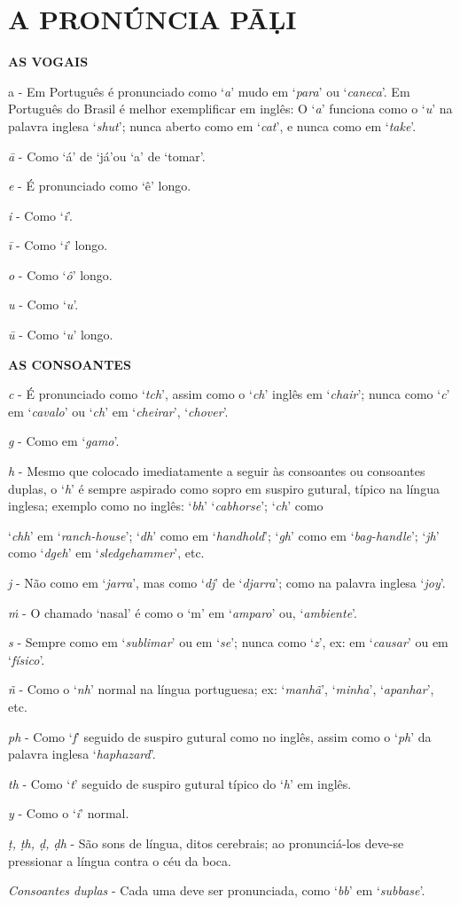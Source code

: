 \chapter{A PRONÚNCIA PĀḶI}

\textbf{AS VOGAIS}


a - Em Português é pronunciado como `\emph{a}' mudo em `\emph{para}' ou `\emph{caneca}'. Em Português do Brasil é melhor exemplificar em inglês: O `\emph{a}' funciona como o `\emph{u}' na palavra inglesa `\emph{shut}'; nunca aberto como em `\emph{cat}', e nunca como em `\emph{take}'.

\emph{ā} - Como `á' de `já'ou `a' de `tomar'.

\emph{e} - É pronunciado como `ê' longo.

\emph{i} - Como `\emph{i}'.

\emph{ī} - Como `\emph{i}' longo.

\emph{o} - Como `\emph{ô}' longo.

\emph{u} - Como `\emph{u}'.

\emph{ū} - Como `\emph{u}' longo.

\textbf{AS CONSOANTES}

\emph{c} - É pronunciado como `\emph{tch}', assim como o `\emph{ch}' inglês em `\emph{chair}'; nunca como `\emph{c}' em `\emph{cavalo}' ou `\emph{ch}' em `\emph{cheirar}', `\emph{chover}'.

\emph{g} - Como em `\emph{gamo}'.

\emph{h} - Mesmo que colocado imediatamente a seguir às consoantes ou consoantes duplas, o `\emph{h}' é sempre aspirado como sopro em suspiro gutural, típico na língua inglesa; exemplo como no inglês: `\emph{bh}' `\emph{cabhorse}'; `\emph{ch}' como

`\emph{chh}' em `\emph{ranch-house}'; `\emph{dh}' como em `\emph{handhold}'; `\emph{gh}' como em `\emph{bag-handle}'; `\emph{jh}' como `\emph{dgeh}' em `\emph{sledgehammer}', etc.

\emph{j} - Não como em `\emph{jarra}', mas como `\emph{dj}' de `\emph{djarra}'; como na palavra inglesa `\emph{joy}'.

\emph{ṁ} - O chamado `nasal' é como o `m' em `\emph{amparo}' ou, `\emph{ambiente}'.

\emph{s} - Sempre como em `\emph{sublimar}' ou em `\emph{se}'; nunca como `\emph{z}', ex: em `\emph{causar}' ou em `\emph{físico}'.

\emph{ñ} - Como o `\emph{nh}' normal na língua portuguesa; ex: `\emph{manhã}', `\emph{minha}', `\emph{apanhar}', etc.

\emph{ph} - Como `\emph{f}' seguido de suspiro gutural como no inglês, assim como o `\emph{ph}' da palavra inglesa `\emph{haphazard}'.

\emph{th} - Como `\emph{t}' seguido de suspiro gutural típico do `\emph{h}' em inglês.

\emph{y} - Como o `\emph{i}' normal.

\emph{ṭ, ṭh, ḍ, ḍh} - São sons de língua, ditos cerebrais; ao pronunciá-los deve-se pressionar a língua contra o céu da boca.

\emph{Consoantes duplas} - Cada uma deve ser pronunciada, como `\emph{bb}' em `\emph{subbase}'.
